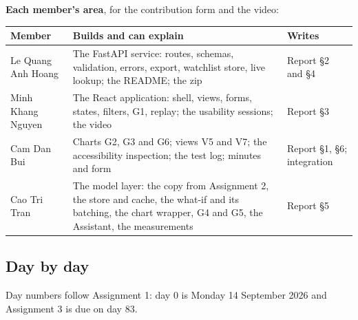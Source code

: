 \textbf{Each member's area}, for the contribution form and the video:

\begin{center}
\small
\begin{tabularx}{\textwidth}{@{}L{3.6cm}Y L{3.3cm}@{}}
\toprule
\textbf{Member} & \textbf{Builds and can explain} & \textbf{Writes} \\
\midrule
Le Quang Anh Hoang & The FastAPI service: routes, schemas, validation, errors, export, watchlist store, live lookup; the README; the zip & Report §2 and §4 \\
Minh Khang Nguyen & The React application: shell, views, forms, states, filters, G1, replay; the usability sessions; the video & Report §3 \\
Cam Dan Bui & Charts G2, G3 and G6; views V5 and V7; the accessibility inspection; the test log; minutes and form & Report §1, §6; integration \\
Cao Tri Tran & The model layer: the copy from Assignment 2, the store and cache, the what-if and its batching, the chart wrapper, G4 and G5, the Assistant, the measurements & Report §5 \\
\bottomrule
\end{tabularx}
\end{center}

\subsection{Day by day}

Day numbers follow Assignment 1: day 0 is Monday 14 September 2026 and Assignment 3 is due on day 83.


